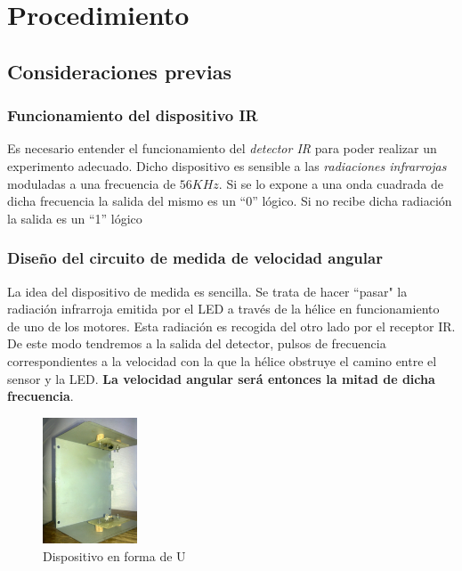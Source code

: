 \documentclass[main]{subfiles}
\begin{document}
\section{Procedimiento}


\subsection{Consideraciones previas}
\subsubsection*{Funcionamiento del dispositivo IR}
Es necesario entender el funcionamiento del \emph{detector IR} para poder realizar un experimento adecuado. Dicho dispositivo es sensible a las \emph{radiaciones infrarrojas} moduladas a una frecuencia de $56KHz$. Si se lo expone a una onda cuadrada de dicha frecuencia la salida del mismo es un ``0'' l\'ogico. Si no recibe dicha radiaci\'on la salida es un ``1'' l\'ogico

\subsubsection*{Dise\~no del circuito de medida de velocidad angular}

La idea del dispositivo de medida es sencilla. Se trata de hacer ``pasar" la radiaci\'on infrarroja emitida por el LED a trav\'es de la h\'elice en funcionamiento de uno de los motores. Esta radiaci\'on es recogida del otro lado por el receptor IR.\\

De este modo tendremos a la salida del detector, pulsos de frecuencia correspondientes a la velocidad con la que la h\'elice obstruye el camino entre el sensor y la LED. \textbf{La velocidad angular ser\'a entonces la mitad de dicha frecuencia}.\\ 

\begin{figure}
  \vspace{-35pt}
  \begin{center}
    \includegraphics[width=0.25\textwidth]{./pics_motores/u.jpg}
  \end{center}
  \vspace{-20pt}
  \caption{Dispositivo en forma de U}
  \label{fig:u}
  \vspace{-10pt}
\end{figure}
\end{document}
